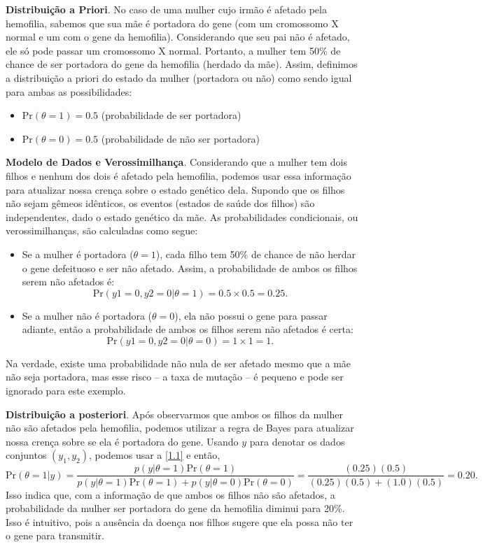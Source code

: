 \textbf{Distribuição a Priori}. No caso de uma mulher cujo irmão é afetado pela hemofilia, sabemos que sua mãe é portadora do gene (com um cromossomo X normal e um com o gene da hemofilia). Considerando que seu pai não é afetado, ele só pode passar um cromossomo X normal. Portanto, a mulher tem 50\% de chance de ser portadora do gene da hemofilia (herdado da mãe). Assim, definimos a distribuição a priori do estado da mulher (portadora ou não) como sendo igual para ambas as possibilidades:
\begin{itemize}[noitemsep]
\item $ \text{Pr}(\theta = 1) = 0.5 $ (probabilidade de ser portadora)
\item $ \text{Pr}(\theta = 0) = 0.5 $ (probabilidade de não ser portadora)
\end{itemize}

\textbf{Modelo de Dados e Verossimilhança}. Considerando que a mulher tem dois filhos e nenhum dos dois é afetado pela hemofilia, podemos usar essa informação para atualizar nossa crença sobre o estado genético dela. Supondo que os filhos não sejam gêmeos idênticos, os eventos (estados de saúde dos filhos) são independentes, dado o estado genético da mãe. As probabilidades condicionais, ou verossimilhanças, são calculadas como segue:
\begin{itemize}[noitemsep]
	\item Se a mulher é portadora ($\theta = 1$), cada filho tem 50\% de chance de não herdar o gene defeituoso e ser não afetado. Assim, a probabilidade de ambos os filhos serem não afetados é:
	\begin{equation*}
	\text{Pr}(y1 = 0, y2 = 0 | \theta = 1) = 0.5 \times 0.5 = 0.25.
	\end{equation*}
	\item Se a mulher não é portadora ($\theta = 0$), ela não possui o gene para passar adiante, então a probabilidade de ambos os filhos serem não afetados é certa:
	\begin{equation*}
	\text{Pr}(y1 = 0, y2 = 0 | \theta = 0) = 1 \times 1 = 1.
	\end{equation*}
\end{itemize}
Na verdade, existe uma probabilidade não nula de ser afetado mesmo que a mãe não seja portadora, mas esse risco -- a taxa de mutação -- é pequeno e pode ser ignorado para este exemplo.

\textbf{Distribuição a posteriori}. Após observarmos que ambos os filhos da mulher não são afetados pela hemofilia, podemos utilizar a regra de Bayes para atualizar nossa crença sobre se ela é portadora do gene. Usando $y$ para denotar os dados conjuntos $(y_1, y_2)$, podemos usar a \autoref{1.1} e então,
\begin{equation*}
\text{Pr}(\theta = 1|y) = \frac{p(y|\theta = 1)\text{Pr}(\theta = 1)}{p(y|\theta = 1)\text{Pr}(\theta = 1) + p(y|\theta = 0)\text{Pr}(\theta = 0)} =  \frac{(0.25)(0.5)}{(0.25)(0.5) + (1.0)(0.5)} = 0.20.
\end{equation*}
Isso indica que, com a informação de que ambos os filhos não são afetados, a probabilidade da mulher ser portadora do gene da hemofilia diminui para 20\%. Isso é intuitivo, pois a ausência da doença nos filhos sugere que ela possa não ter o gene para transmitir.

